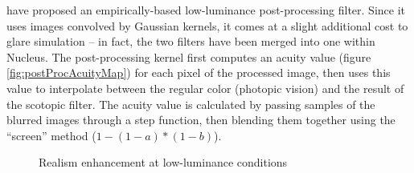 \citet{Thompson_aspatial} have proposed an empirically-based low-luminance post-processing filter. Since it uses images convolved by Gaussian kernels, it comes at a slight additional cost to glare simulation -- in fact, the two filters have been merged into one within Nucleus. The post-processing kernel first computes an acuity value (figure \ref{fig:postProcAcuityMap}) for each pixel of the processed image, then uses this value to interpolate between the regular color (photopic vision) and the result of the scotopic filter. The acuity value is calculated by passing samples of the blurred images through a step function, then blending them together using the ``screen'' method ($1 - (1-a)*(1-b)$).

\begin{figure}[h!]
  \centering
  \caption[Scotopic vision]{Realism enhancement at low-luminance conditions}
  \label{fig:postProcAcuityComparison}
\end{figure}

